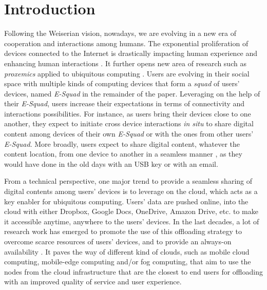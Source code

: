 \section{Introduction}

Following the Weiserian vision, nowadays, we are
evolving in a new era of cooperation and interactions among humans.
The exponential proliferation of devices connected to the Internet is
drastically impacting human experience and enhancing human
interactions \cite{Dearman:2008, Oh:2017, Sohn:2008,Harper08}. It further opens new area of research such as
\textit{proxemics} applied to ubiquitous computing
\cite{Marquardt:2011}. Users are evolving in their social space with 
multiple kinds of computing devices that form a \textit{squad} of users'
devices, named \textit{E-Squad} in the remainder of the
paper. Leveraging on the help of their \textit{E-Squad}, users increase
their expectations in terms of connectivity and interactions
possibilities. For instance, as users bring
their devices close to one another, they expect to initiate cross
device interactions \textit{in situ} to share digital content
\cite{Oh:2017} among devices of their own \textit{E-Squad} or with the ones 
from other users' \textit{E-Squad}. More broadly, users expect to share digital content,
whatever the content location, from one
device to another in a seamless manner \cite{Dearman:2008}, as they
would have done in the old days with an USB key or with an email. 

From a technical perspective, one major trend to provide a seamless
sharing of digital contents among users' devices is to leverage on the
cloud, which acts as a key enabler for ubiquitous computing. Users' data
are pushed online, into the cloud with either Dropbox, Google Docs,
OneDrive, Amazon Drive, etc. to make it accessible anytime,
anywhere to the users' devices.  In the last decades, a lot of research work has
emerged to promote the use of this offloading strategy to overcome scarce
resources of users' devices, and to provide an always-on availability
\cite{Zhang:2014,Gordon:2012,Chun:2011}. It paves the way of different kind
of clouds, such as mobile cloud computing, mobile-edge computing
and/or fog computing, that aim to use the nodes from the cloud
infrastructure that are the closest to end users
for offloading with an improved quality of service and user experience.


